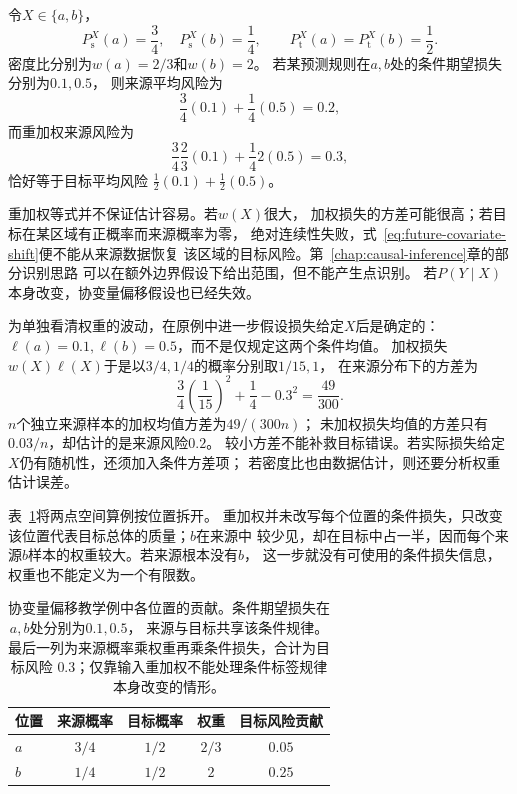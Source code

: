 \begin{example}[两点空间上的重加权]
  \label{ex:future-two-point-reweighting}
  令$X\in\{a,b\}$，
  \[
    P_{\mathrm s}^{X}(a)=\frac{3}{4},
    \quad
    P_{\mathrm s}^{X}(b)=\frac{1}{4},
    \qquad
    P_{\mathrm t}^{X}(a)
    =
    P_{\mathrm t}^{X}(b)
    =
    \frac{1}{2}.
  \]
  密度比分别为$w(a)=2/3$和$w(b)=2$。
  若某预测规则在$a,b$处的条件期望损失分别为$0.1,0.5$，
  则来源平均风险为
  \[
    \frac{3}{4}(0.1)+\frac{1}{4}(0.5)=0.2,
  \]
  而重加权来源风险为
  \[
    \frac{3}{4}\frac{2}{3}(0.1)
    +
    \frac{1}{4}2(0.5)
    =
    0.3,
  \]
  恰好等于目标平均风险
  $\frac12(0.1)+\frac12(0.5)$。
\end{example}

重加权等式并不保证估计容易。若$w(X)$很大，
加权损失的方差可能很高；若目标在某区域有正概率而来源概率为零，
绝对连续性失败，式~\eqref{eq:future-covariate-shift}便不能从来源数据恢复
该区域的目标风险。第~\ref{chap:causal-inference}章的部分识别思路
可以在额外边界假设下给出范围，但不能产生点识别。
若$P(Y\mid X)$本身改变，协变量偏移假设也已经失效。

为单独看清权重的波动，在原例中进一步假设损失给定$X$后是确定的：
$\ell(a)=0.1,\ell(b)=0.5$，而不是仅规定这两个条件均值。
加权损失$w(X)\ell(X)$于是以$3/4,1/4$的概率分别取$1/15,1$，
在来源分布下的方差为
\[
  \frac34\left(\frac1{15}\right)^2+\frac14-0.3^2
  =\frac{49}{300}.
\]
$n$个独立来源样本的加权均值方差为$49/(300n)$；
未加权损失均值的方差只有$0.03/n$，却估计的是来源风险$0.2$。
较小方差不能补救目标错误。若实际损失给定$X$仍有随机性，还须加入条件方差项；
若密度比也由数据估计，则还要分析权重估计误差。

表~\ref{tab:future-reweighting-contributions}将两点空间算例按位置拆开。
重加权并未改写每个位置的条件损失，只改变该位置代表目标总体的质量；$b$在来源中
较少见，却在目标中占一半，因而每个来源$b$样本的权重较大。若来源根本没有$b$，
这一步就没有可使用的条件损失信息，权重也不能定义为一个有限数。

\begin{table}[htbp]
  \centering
  \begin{tabular}{lcccc}
    \toprule
    位置 & 来源概率 & 目标概率 & 权重 & 目标风险贡献\\
    \midrule
    $a$ & $3/4$ & $1/2$ & $2/3$ & $0.05$\\
    $b$ & $1/4$ & $1/2$ & $2$ & $0.25$\\
    \bottomrule
  \end{tabular}
  \caption{协变量偏移教学例中各位置的贡献。条件期望损失在$a,b$处分别为$0.1,0.5$，
  来源与目标共享该条件规律。最后一列为来源概率乘权重再乘条件损失，合计为目标风险
  $0.3$；仅靠输入重加权不能处理条件标签规律本身改变的情形。}
  \label{tab:future-reweighting-contributions}
\end{table}

